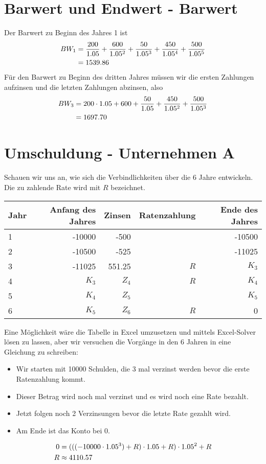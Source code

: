 \documentclass{article}
\begin{document}
	\section*{Barwert und Endwert - Barwert}
	Der Barwert zu Beginn des Jahres 1 ist
	\begin{align}
		BW_1 &= \frac{200}{1.05} + \frac{600}{1.05^2} + \frac{50}{1.05^3} + \frac{450}{1.05^4} + \frac{500}{1.05^5} \notag \\
		&= 1539.86 \notag
	\end{align}
	Für den Barwert zu Beginn des dritten Jahres müssen wir die ersten Zahlungen aufzinsen und die letzten Zahlungen abzinsen, also
	\begin{align}
		BW_3 &= 200\cdot 1.05 + 600 + \frac{50}{1.05} + \frac{450}{1.05^2} + \frac{500}{1.05^3} \notag \\
		&= 1697.70 \notag
	\end{align}

	\section*{Umschuldung - Unternehmen A}
	Schauen wir uns an, wie sich die Verbindlichkeiten über die 6 Jahre entwickeln. Die zu zahlende Rate wird mit $R$ bezeichnet.
	\begin{center}
		\begin{tabular}{l|r|r|r|r}
			\textbf{Jahr} & \textbf{Anfang des Jahres} & \textbf{Zinsen} & \textbf{Ratenzahlung} & \textbf{Ende des Jahres} \\
			\hline
			1 & -10000 & -500 & & -10500 \\
			2 & -10500 & -525 & & -11025 \\
			3 & -11025 & 551.25 & $R$ & $K_3$ \\
			4 & $K_3$ & $Z_4$ & $R$ & $K_4$ \\
			5 & $K_4$ & $Z_5$ & & $K_5$ \\
			6 & $K_5$ & $Z_6$ & $R$ & 0
		\end{tabular}
	\end{center}
	Eine Möglichkeit wäre die Tabelle in Excel umzusetzen und mittels Excel-Solver lösen zu lassen, aber wir versuchen die Vorgänge in den 6 Jahren in eine Gleichung zu schreiben:
	\begin{itemize}
		\item Wir starten mit 10000 Schulden, die 3 mal verzinst werden bevor die erste Ratenzahlung kommt.
		\item Dieser Betrag wird noch mal verzinst und es wird noch eine Rate bezahlt.
		\item Jetzt folgen noch 2 Verzinsungen bevor die letzte Rate gezahlt wird.
		\item Am Ende ist das Konto bei 0.
	\end{itemize}
	\begin{align}
		0 &= (((-10000 \cdot 1.05^3) + R) \cdot 1.05 + R) \cdot 1.05^2 + R \notag \\
		R &\approx 4110.57 \notag
	\end{align}
\end{document}
